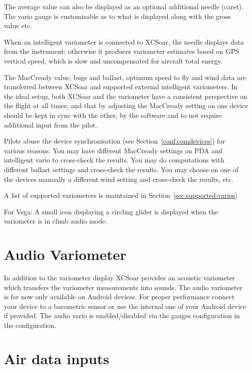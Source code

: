 The average value can also be displayed as an optional additional
needle (caret).
The vario gauge is customisable  as to what is displayed
along with the gross value etc.

When an intelligent variometer is connected to XCSoar, the needle
displays data from the instrument; otherwise it produces variometer
estimates based on GPS vertical speed, which is slow and uncompensated
for aircraft total energy.  

The MacCready value, bugs and ballast, optimum speed to fly and wind
data are transferred between XCSoar and supported external intelligent
variometers.  In the ideal setup, both XCSoar and the variometer have
a consistent perspective on the flight at all times; and that by
adjusting the MacCready setting on one device should be kept in sync
with the other, by the software and to not require additional input from
the pilot.

Pilots abuse the device synchronisation (see Section~\ref{conf:comdevices}) for various
reasons. You may have  different MacCready settings on PDA and intelligent vario
to cross-check the results. You may do computations with different ballast 
settings and cross-check the results. You may choose on one of the devices
manually a different wind setting and cross-check the results, etc.

A list of supported variometers is maintained in
Section~\ref{sec:supported-varios}.

For Vega: A small icon displaying a circling glider is displayed when
the variometer is in climb audio mode.

\section{Audio Variometer}

In addition to the variometer display XCSoar provides an acoustic variometer which transfers the 
variometer measurements into sounds. The audio variometer is for now only available
on Android devices. For proper performance connect your device to a barometric sensor or use the
internal one of your Android device if provided.
The audio vario is enabled/disabled via the gauges configuration in the configuration.


\section{Air data inputs}

